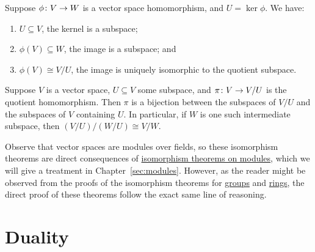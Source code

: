 \begin{theorem}\label{thm:iso-1-vsp}
    Suppose \(\phi\colon V\to W\) is a vector space homomorphism,
    and \(U = \ker\phi\).
    We have:
    \begin{enumerate}[label={(\alph*)}, itemsep=0mm]
        \item \(U \subseteq V\), the kernel is a subspace;
        \item \(\phi(V) \subseteq W\), the image is a subspace; and
        \item \(\phi(V) \cong V/U\), the image is uniquely isomorphic to the quotient subspace.
    \end{enumerate}
\end{theorem}
\begin{theorem}\label{thm:iso-3-vsp}\label{thm:iso-4-vsp}
    Suppose \(V\) is a vector space, \(U \subseteq V\) some subspace,
    and \(\pi\colon V\to V/U\) is the quotient homomorphism.
    Then \(\pi\) is a bijection between the subspaces of \(V/U\)
    and the subspaces of \(V\) containing \(U\).
    In particular, if \(W\) is one such intermediate subspace,
    then \((V/U)/(W/U) \cong V/W\).
\end{theorem}
\begin{remark}
    Observe that vector spaces are modules over fields,
    so these isomorphism theorems are direct consequences of
    \hyperref[thm:iso-1-mod]{isomorphism theorems on modules},
    which we will give a treatment in Chapter~\ref{sec:modules}.
    However, as the reader might be observed
    from the proofs of the isomorphism theorems
    for \hyperref[thm:iso-1-group]{groups} and \hyperref[thm:iso-1-ring]{rings},
    the direct proof of these theorems follow the exact same line of reasoning.
\end{remark}


\section{Duality}

